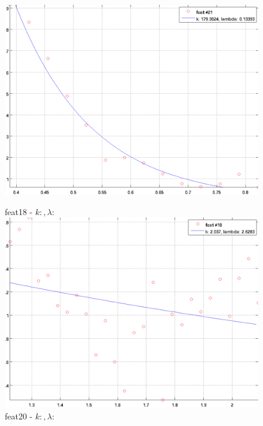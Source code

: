 \documentclass[12pt]{report}
\begin{document}
\begin{figure}[H]
\begin{minipage}[t]{0.5\linewidth}
	\includegraphics[scale=\imFeat]{images/feat21}\\
\end{minipage}
\begin{minipage}[t]{0.5\linewidth}
	\centering
	feat18 - $k: , \lambda:  $\\
	\includegraphics[scale=\imFeat]{images/feat18}\\
	feat20 - $k: , \lambda:  $\\

\end{minipage}
\end{figure}
\end{document}
